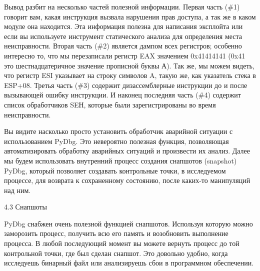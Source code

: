 \documentclass[12pt]{book}
\begin{document}

Вывод разбит на несколько частей полезной информации. Первая часть (\#1) говорит вам, какая инструкция вызвала нарушения прав доступа, а так же в каком модуле она находится. Эта информация полезна для написания эксплойта или если вы используете инструмент статического анализа для определения места неисправности. Вторая часть (\#2) является дампом всех регистров; особенно интересно то, что мы перезаписали регистр EAX значением 0x41414141 (0x41 это шестнадцатеричное значение прописной буквы А). Так же, мы можем видеть, что регистр ESI указывает на строку символов A, такую же, как указатель стека в ESP+08. Третья часть (\#3) содержит дизассемблерные инструкции до и после вызывающей ошибку инструкции. И наконец последняя часть (\#4) содержит список обработчиков SEН, которые были зарегистрированы во время неисправности.

Вы видите насколько просто установить обработчик аварийной ситуации с использованием PyDbg. Это невероятно полезная функция, позволяющая автоматизировать обработку аварийных ситуаций и произвести их анализ. Далее мы будем использовать внутренний процесс создания снапшотов (snapshot) PyDbg, который позволяет создавать контрольные точки, в исследуемом процессе, для возврата к сохраненному состоянию, после каких-то манипуляций над ним.


4.3 Снапшоты

PyDbg снабжен очень полезной функцией снапшотов. Используя которую можно заморозить процесс, получить всю его память и возобновить выполнение процесса. В любой последующий момент вы можете вернуть процесс до той контрольной точки, где был сделан снапшот. Это довольно удобно, когда исследуешь бинарный файл или анализируешь сбои в программном обеспечении.
\end{document}
